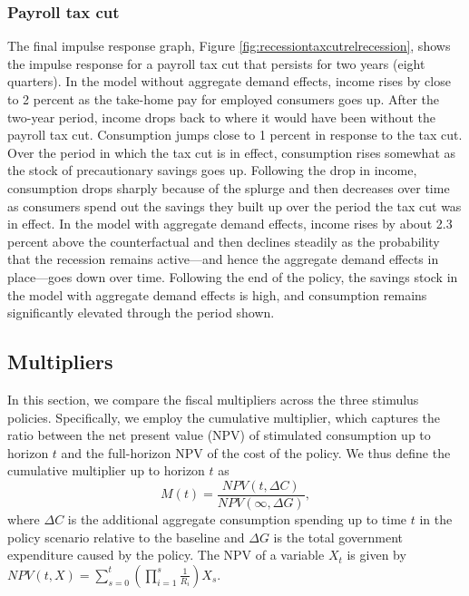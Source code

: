 \subsubsection{Payroll tax cut}



The final impulse response graph, Figure \ref{fig:recessiontaxcutrelrecession}, shows the impulse response for a payroll tax cut that persists for two years (eight quarters).
In the model without aggregate demand effects, income rises by close to 2 percent as the take-home pay for employed consumers goes up.
After the two-year period, income drops back to where it would have been without the payroll tax cut.
Consumption jumps close to 1 percent in response to the tax cut.
Over the period in which the tax cut is in effect, consumption rises somewhat as the stock of precautionary savings goes up.
Following the drop in income, consumption drops sharply because of the splurge and then decreases over time as consumers spend out the savings they built up over the period the tax cut was in effect.
In the model with aggregate demand effects, income rises by about 2.3 percent above the counterfactual and then declines steadily as the probability that the recession remains active---and hence the aggregate demand effects in place---goes down over time.
Following the end of the policy, the savings stock in the model with aggregate demand effects is high, and consumption remains significantly elevated through the period shown.

\hypertarget{multipliers}{}\par\subsection{Multipliers}
\label{sec:multipliers}


In this section, we compare the fiscal multipliers across the three stimulus policies.
Specifically, we employ the cumulative multiplier, which captures the ratio between the net present value (NPV) of stimulated consumption up to horizon $t$ and the full-horizon NPV of the cost of the policy.
We thus define the cumulative multiplier up to horizon $t$ as
\begin{equation}
	\label{eqn:cumMultiplier}
  M(t) = \frac{NPV(t,\Delta C)}{NPV (\infty,\Delta G)},
\end{equation}
where $\Delta C$ is the additional aggregate consumption spending up to time $t$ in the policy scenario relative to the baseline and $\Delta G$ is the total government expenditure caused by the policy.
The NPV of a variable $X_t$ is given by 
$NPV(t,X) = \sum_{s=0}^{t} \left( \prod_{i=1}^{s} \frac{1}{R_i} \right) X_s$.

